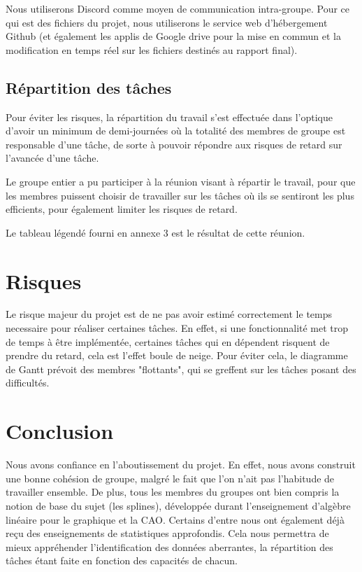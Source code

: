 \documentclass[a4paper,12pt]{article} %
\begin{document}
Nous utiliserons Discord comme moyen de communication intra-groupe. Pour ce qui est des fichiers du projet, nous utiliserons le service web d’hébergement Github (et également les applis de Google drive pour la mise en commun  et la modification en temps réel sur les fichiers destinés au rapport final).


\newpage
  \subsection{Répartition des tâches}

Pour éviter les risques, la répartition du travail s’est effectuée dans l’optique d’avoir un minimum de demi-journées où la totalité des membres de groupe est responsable d’une tâche, de sorte à pouvoir répondre aux risques de retard sur l’avancée d’une tâche.

Le groupe entier a pu participer à la réunion visant à répartir le travail, pour que les membres puissent choisir de travailler sur les tâches où ils se sentiront les plus efficients, pour également limiter les risques de retard.

Le tableau légendé fourni en annexe 3 est le résultat de cette réunion.


\section{Risques}

Le risque majeur du projet est de ne pas avoir estimé correctement le temps necessaire pour réaliser certaines tâches. En effet, si une fonctionnalité met trop de temps à être implémentée, certaines tâches qui en dépendent risquent de prendre du retard, cela est l'effet boule de neige. Pour éviter cela, le diagramme de Gantt prévoit des membres "flottants", qui se greffent sur les tâches posant des difficultés.

\section*{Conclusion}

Nous avons confiance en l'aboutissement du projet. En effet, nous avons construit une bonne cohésion de groupe, malgré le fait que l'on n'ait pas l'habitude de travailler ensemble. De plus, tous les membres du groupes ont bien compris la notion de base du sujet (les splines), développée durant l'enseignement d'algèbre linéaire pour le graphique et la CAO. Certains d'entre nous ont également déjà reçu des enseignements de statistiques approfondis. Cela nous permettra de mieux appréhender l'identification des données aberrantes, la répartition des tâches étant faite en fonction des capacités de chacun. 
\end{document}

